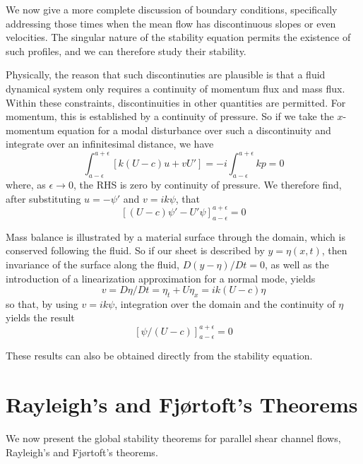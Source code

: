 \documentclass[letterpaper, 11pt, onecolumn]{article}
\begin{document}
We now give a more complete discussion of boundary conditions, specifically addressing those times when the mean flow has discontinuous slopes or even velocities. The singular nature of the stability equation permits the existence of such profiles, and we can therefore study their stability.

Physically, the reason that such discontinuties are plausible is that a fluid dynamical system only requires a continuity of momentum flux and mass flux. Within these constraints, discontinuities in other quantities are permitted. For momentum, this is established by a continuity of pressure. So if we take the $x$-momentum equation for a modal disturbance over such a discontinuity and integrate over an infinitesimal distance, we have
\begin{equation*}
\int_{a-\epsilon}^{a+\epsilon} \left[k (U - c) u + v U' \right] = - i \int_{a-\epsilon}^{a+\epsilon} k p = 0
\end{equation*}
where, as $\epsilon \rightarrow 0$, the RHS is zero by continuity of pressure. We therefore find, after substituting $u = -\psi'$ and $v = i k \psi$, that
\begin{equation}
\left[\left(U-c\right)\psi' - U' \psi \right]_{a-\epsilon}^{a+\epsilon} = 0
\end{equation}

Mass balance is illustrated by a material surface through the domain, which is conserved following the fluid. So if our sheet is described by $y = \eta(x, t)$, then invariance of the surface along the fluid, $D (y - \eta) / D t = 0$, as well as the introduction of a linearization approximation for a normal mode, yields
\begin{equation*}
v = D \eta / D t = \eta_t + U \eta_x = i k (U - c) \eta
\end{equation*}
so that, by using $v = i k \psi$, integration over the domain and the continuity of $\eta$ yields the result
\begin{equation}
\left[\psi / (U - c) \right]_{a-\epsilon}^{a+\epsilon} = 0
\end{equation}

These results can also be obtained directly from the stability equation.

\section{Rayleigh's and Fj\o rtoft's Theorems}

We now present the global stability theorems for parallel shear channel flows, Rayleigh's and Fj\o rtoft's theorems.
\end{document}
